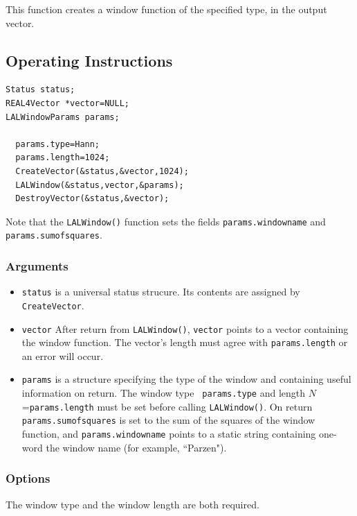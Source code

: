 \documentclass{article}
\begin{document}
This function creates a window function of the specified type, in the
output vector.

\subsection{Operating Instructions}


\begin{verbatim}
Status status; 
REAL4Vector *vector=NULL;
LALWindowParams params;

  params.type=Hann;
  params.length=1024;
  CreateVector(&status,&vector,1024);
  LALWindow(&status,vector,&params);
  DestroyVector(&status,&vector);

\end{verbatim}

Note that the {\tt LALWindow()} function sets the fields {\tt params.windowname} and
{\tt params.sumofsquares}.

\subsubsection{Arguments}


\begin{itemize}
\item {\tt status\/} is a universal status strucure. Its contents are 
assigned by {\tt CreateVector}.
\item {\tt vector\/} After
return from {\tt LALWindow()}, {\tt vector} points to a vector containing the window function.
The vector's length must
agree with {\tt params.length} or an error will occur.
\item {\tt params\/} is a structure specifying the type of the window
and containing useful information on return.  The window type {\tt
params.type} and length $N$={\tt params.length} must be set before calling
{\tt LALWindow()}.  On return {\tt params.sumofsquares} is set to the sum of
the squares of the window function, and {\tt params.windowname} points
to a static string containing one-word the window name (for example,
``Parzen").
\end{itemize}

\subsubsection{Options}

The window type and the window length are both required.
\end{document}
